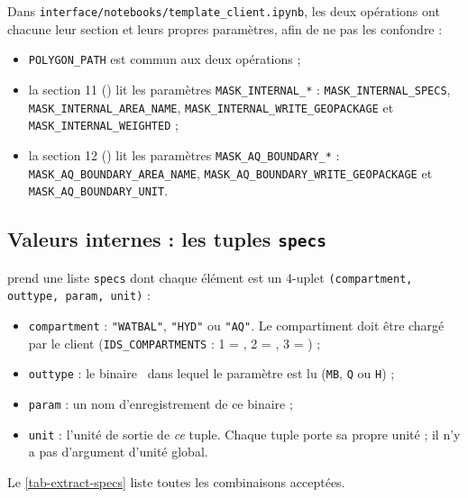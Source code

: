 Dans \texttt{interface/notebooks/template\_client.ipynb}, les deux opérations ont chacune leur section et leurs propres paramètres, afin de ne pas les confondre :
\begin{itemize}
    \item \texttt{POLYGON\_PATH} est commun aux deux opérations ;
    \item la section 11 () lit les paramètres \texttt{MASK\_INTERNAL\_*} : \texttt{MASK\_INTERNAL\_SPECS}, \texttt{MASK\_INTERNAL\_AREA\_NAME}, \texttt{MASK\_INTERNAL\_WRITE\_GEOPACKAGE} et \texttt{MASK\_INTERNAL\_WEIGHTED} ;
    \item la section 12 () lit les paramètres \texttt{MASK\_AQ\_BOUNDARY\_*} : \texttt{MASK\_AQ\_BOUNDARY\_AREA\_NAME}, \texttt{MASK\_AQ\_BOUNDARY\_WRITE\_GEOPACKAGE} et \texttt{MASK\_AQ\_BOUNDARY\_UNIT}.
\end{itemize}

\subsection{Valeurs internes : les tuples \texttt{specs}}
 prend une liste \texttt{specs} dont chaque élément est un 4-uplet \texttt{(compartment, outtype, param, unit)} :
\begin{itemize}
    \item \texttt{compartment} : \texttt{"WATBAL"}, \texttt{"HYD"} ou \texttt{"AQ"}. Le compartiment doit être chargé par le client (\texttt{IDS\_COMPARTMENTS} : 1 = , 2 = , 3 = ) ;
    \item \texttt{outtype} : le binaire \cawaqs~dans lequel le paramètre est lu (\texttt{MB}, \texttt{Q} ou \texttt{H}) ;
    \item \texttt{param} : un nom d'enregistrement de ce binaire ;
    \item \texttt{unit} : l'unité de sortie de \emph{ce} tuple. Chaque tuple porte sa propre unité ; il n'y a pas d'argument d'unité global.
\end{itemize}
Le \cref{tab-extract-specs} liste toutes les combinaisons acceptées.

